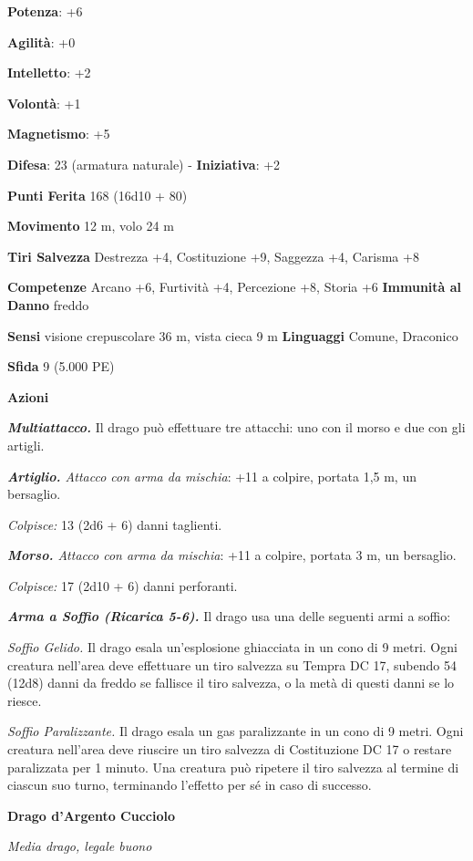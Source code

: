 \begin{multicols}{2}
\textbf{Potenza}: +6

\textbf{Agilità}: +0

\textbf{Intelletto}: +2

\textbf{Volontà}: +1

\textbf{Magnetismo}: +5

\textbf{Difesa}: 23 (armatura naturale) - \textbf{Iniziativa}: +2

\textbf{Punti Ferita} 168 (16d10 + 80)

\textbf{Movimento} 12 m, volo 24 m

\textbf{Tiri Salvezza} Destrezza +4, Costituzione +9, Saggezza +4,
Carisma +8

\textbf{Competenze} Arcano +6, Furtività +4, Percezione +8, Storia +6
\textbf{Immunità al Danno} freddo

\textbf{Sensi} visione crepuscolare 36 m, vista cieca 9 m
\textbf{Linguaggi} Comune, Draconico

\textbf{Sfida} 9 (5.000 PE)

\textbf{Azioni}

\emph{\textbf{Multiattacco.}} Il drago può effettuare tre attacchi: uno
con il morso e due con gli artigli.

\emph{\textbf{Artiglio.} Attacco con arma da mischia}: +11 a colpire,
portata 1,5 m, un bersaglio.

\emph{Colpisce:} 13 (2d6 + 6) danni taglienti.

\emph{\textbf{Morso.} Attacco con arma da mischia}: +11 a colpire,
portata 3 m, un bersaglio.

\emph{Colpisce:} 17 (2d10 + 6) danni perforanti.

\emph{\textbf{Arma a Soffio (Ricarica 5-6).}} Il drago usa una delle
seguenti armi a soffio:

\emph{Soffio Gelido.} Il drago esala un'esplosione ghiacciata in un cono
di 9 metri. Ogni creatura nell'area deve effettuare un tiro salvezza su Tempra DC 17, subendo 54 (12d8) danni da freddo se fallisce il
tiro salvezza, o la metà di questi danni se lo riesce.

\emph{Soffio Paralizzante.} Il drago esala un gas paralizzante in un
cono di 9 metri. Ogni creatura nell'area deve riuscire un tiro salvezza
di Costituzione DC 17 o restare paralizzata per 1 minuto. Una creatura
può ripetere il tiro salvezza al termine di ciascun suo turno,
terminando l'effetto per sé in caso di successo.

\textbf{Drago d'Argento Cucciolo}

\emph{Media drago, legale buono}


\end{multicols}

